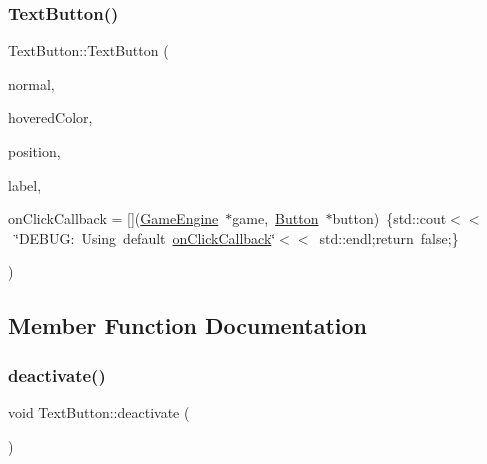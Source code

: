 \mbox{\label{class_text_button_a24c990ee34fef994f9f70a6773b963c5}} 
\subsubsection{\texorpdfstring{TextButton()}{TextButton()}\hspace{0.1cm}{\footnotesize\ttfamily [2/2]}}
{\footnotesize\ttfamily Text\+Button\+::\+Text\+Button (\begin{DoxyParamCaption}\item[{sf\+::\+Texture $\ast$}]{normal,  }\item[{const sf\+::\+Color \&}]{hovered\+Color,  }\item[{const sf\+::\+Vector2f \&}]{position,  }\item[{const sf\+::\+Text \&}]{label,  }\item[{bool($\ast$)(\mbox{\hyperlink{class_game_engine}{Game\+Engine}} $\ast$game, \mbox{\hyperlink{class_button}{Button}} $\ast$button)}]{on\+Click\+Callback = {\ttfamily \mbox{[}\mbox{]}(\mbox{\hyperlink{class_game_engine}{Game\+Engine}}~$\ast$game,~\mbox{\hyperlink{class_button}{Button}}~$\ast$button)~\{std\+:\+:cout$<$$<$~\char`\"{}DEBUG\+:~Using~default~\mbox{\hyperlink{class_button_a24293b3761997dd52758ee21c0058661}{on\+Click\+Callback}}\char`\"{}$<$$<$~std\+:\+:endl;return~false;\}} }\end{DoxyParamCaption})}



\subsection{Member Function Documentation}
\mbox{\label{class_text_button_a8b0c38245988615e9cae8795b2f177cd}} 
\subsubsection{\texorpdfstring{deactivate()}{deactivate()}}
{\footnotesize\ttfamily void Text\+Button\+::deactivate (\begin{DoxyParamCaption}{ }\end{DoxyParamCaption})\hspace{0.3cm}{\ttfamily [inline]}}

